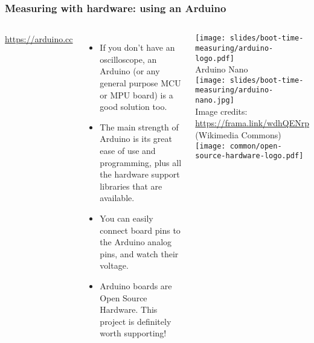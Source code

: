 \begin{frame}
\frametitle{Measuring with hardware: using an Arduino}
\begin{columns}
  \url{https://arduino.cc}
  \begin{itemize}
  \item If you don't have an oscilloscope, an Arduino (or any general
        purpose MCU or MPU board) is a good solution too.
  \item The main strength of Arduino is its great ease of use and
        programming, plus all the hardware support libraries that are available.
  \item You can easily connect board pins to the Arduino analog pins, and
        watch their voltage.
  \item Arduino boards are Open Source Hardware. This project is
      definitely worth supporting!
  \end{itemize}
  \begin{center}
  \tiny
  \texttt{[image: slides/boot-time-measuring/arduino-logo.pdf]}\\
  \vspace{1cm}
  Arduino Nano\\
  \texttt{[image: slides/boot-time-measuring/arduino-nano.jpg]}\\
  Image credits: \url{https://frama.link/wdhQENrp} (Wikimedia Commons)\\
  \vspace{1cm}
  \texttt{[image: common/open-source-hardware-logo.pdf]}
  \end{center}
\end{columns}
\end{frame}

